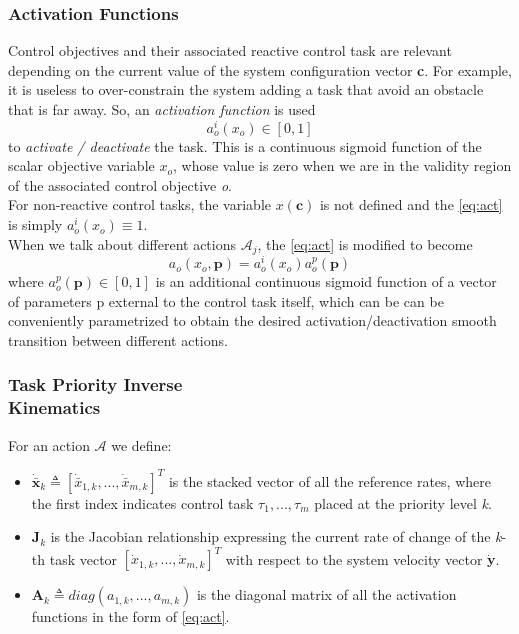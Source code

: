 \documentclass[a4paper, 12pt, notitlepage]{article}
\begin{document}
\begin{multicols}{2}
		\subsubsection{Activation Functions} \label{subsubsec:activFunc}
		\hspace{7px} Control objectives and their associated reactive control task are relevant depending on the current value of the system configuration vector \textbf{c}.
		For example, it is useless to over-constrain the system adding a task that avoid an obstacle that is far away. So, an \textit{activation function} is used 
		\begin{equation}\label{eq:act}
			a_o^i (x_o) \in [0,1]
		\end{equation}
		to \textit{activate / deactivate} the task. This is a continuous sigmoid function of the scalar objective variable $x_o$, whose value is zero when we are in the validity region of the associated control objective \textit{o}.\\
		For non-reactive control tasks, the variable $x(\boldsymbol{c})$ is not defined and the \eqref{eq:act} is simply $a_o^i (x_o) \equiv 1$.\\
		\hspace*{7px}When we talk about different actions $\mathcal{A}_j$, the \eqref{eq:act} is modified to become
		\begin{equation}
			a_o(x_o, \boldsymbol{p}) = a_o^i (x_o) a_o^p(\boldsymbol{p})
		\end{equation}
		where $a_o^p(\boldsymbol{p})\in [0,1]$ is an additional continuous sigmoid function of a vector of parameters p external to the control
		task itself, which can be can be conveniently parametrized to obtain the desired activation/deactivation smooth transition between different actions.
		
		
		\subsubsection{Task Priority Inverse\\ Kinematics}
		\hspace{7px} For an action  $\mathcal{A}$ we define:
		\begin{itemize}[leftmargin=*]
			\item $  \dot{\bar{\boldsymbol{x}}}_k \triangleq [   \dot{\bar{x}}_{1,k},...,\dot{\bar{x}}_{m,k}   ]^T $ is the stacked vector of all the reference rates, where the first index indicates control task $\tau_1,...,\tau_m$ placed at the priority level \textit{k}.
			\item $\boldsymbol{J}_k$ is the Jacobian relationship expressing the current rate
			of change of the \textit{k}-th task vector $[\dot{x}_{1,k},...,\dot{x}_{m,k}]^T$  with
			respect to the system velocity vector $\dot{\boldsymbol{y}}$.
			\item $\boldsymbol{A}_k \triangleq diag(a_{1,k},...,a_{m,k})$ is the diagonal matrix of all the activation functions in the form of \eqref{eq:act}.
		\end{itemize}
		

\end{multicols}
\end{document}
